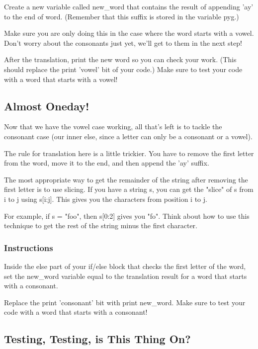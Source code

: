 \documentclass[12pt,a4paper,final,twoside,onecolumn,titlepage]{book}
\begin{document}
Create a new variable called new\_word that contains the result of appending 'ay' to the end of word. (Remember that this suffix is stored in the variable pyg.)

Make sure you are only doing this in the case where the word starts with a vowel. Don't worry about the consonants just yet, we'll get to them in the next step!

After the translation, print the new word so you can check your work. (This should replace the print 'vowel' bit of your code.) Make sure to test your code with a word that starts with a vowel!

\subsection{Almost Oneday!}

Now that we have the vowel case working, all that's left is to tackle the consonant case (our inner else, since a letter can only be a consonant or a vowel).

The rule for translation here is a little trickier. You have to remove the first letter from the word, move it to the end, and then append the 'ay' suffix.

The most appropriate way to get the remainder of the string after removing the first letter is to use slicing. If you have a string s, you can get the "slice" of s from i to j using s[i:j]. This gives you the characters from position i to j.

For example, if s = "foo", then s[0:2] gives you "fo". Think about how to use this technique to get the rest of the string minus the first character.

\subsubsection{Instructions}

Inside the else part of your if/else block that checks the first letter of the word, set the new\_word variable equal to the translation result for a word that starts with a consonant.

Replace the print 'consonant' bit with print new\_word. Make sure to test your code with a word that starts with a consonant!

\subsection{Testing, Testing, is This Thing On?}
\end{document}
